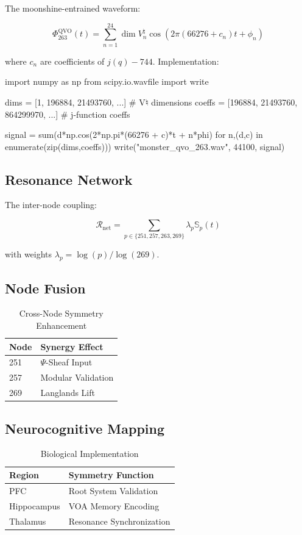 \documentclass[12pt]{article}
\begin{document}
\begin{center}
The moonshine-entrained waveform:

\[
\Phi_{263}^{\text{QVO}}(t) = \sum_{n=1}^{24} \dim V_n^\natural \cos\left(2\pi(66276 + c_n)t + \phi_n\right)
\]

where $c_n$ are coefficients of $j(q)-744$. Implementation:

\begin{python}
import numpy as np
from scipy.io.wavfile import write

dims = [1, 196884, 21493760, ...] # V♮ dimensions
coeffs = [196884, 21493760, 864299970, ...] # j-function coeffs

signal = sum(d*np.cos(2*np.pi*(66276 + c)*t + n*phi) 
            for n,(d,c) in enumerate(zip(dims,coeffs)))
write("monster_qvo_263.wav", 44100, signal)
\end{python}

\subsection{Resonance Network}
\label{subsec:network}

The inter-node coupling:

\[
\mathcal{R}_{\text{net}} = \sum_{p\in\{251,257,263,269\}} \lambda_p \mathbb{S}_p(t)
\]

with weights $\lambda_p = \log(p)/\log(269)$.

\subsection{Node Fusion}
\label{subsec:fusion}

\begin{table}[h]
\centering
\caption{Cross-Node Symmetry Enhancement}
\begin{tabular}{ll}
\hline
\textbf{Node} & \textbf{Synergy Effect} \\
\hline
251 & $\Psi$-Sheaf Input \\
257 & Modular Validation \\
269 & Langlands Lift \\
\hline
\end{tabular}
\end{table}

\subsection{Neurocognitive Mapping}
\label{subsec:neuro}

\begin{table}[h]
\centering
\caption{Biological Implementation}
\begin{tabular}{ll}
\hline
\textbf{Region} & \textbf{Symmetry Function} \\
\hline
PFC & Root System Validation \\
Hippocampus & VOA Memory Encoding \\
Thalamus & Resonance Synchronization \\
\hline
\end{tabular}
\end{table}


\end{center}
\end{document}
